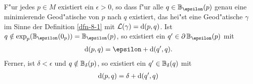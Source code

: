 \begin{Satz}\label{satz-8-7}
  F"ur jedes $p \in M$ existiert ein $\epsilon > 0$, so dass f"ur alle $q \in \B_{\epsilon}(p)$ genau eine minimierende Geod"atische von $p$ nach $q$ existiert, das hei"st eine Geod"atische $\gamma$ im Sinne der Definition \ref{dfn-8-1} mit $\mathcal L(\gamma) = \mathrm{d}(p,q)$.
  Ist $q \notin \exp_p(\B_{\epsilon}(0_p)) = \B_{\epsilon}(p)$, so existiert ein $q' \in \partial \B_{\epsilon}(p)$ mit
  \begin{align*}
    \dop(p,q) = \epsilon + \dop(q',q).
  \end{align*}
  Ferner, ist $\delta < \epsilon$ und $q \notin \operatorname{\mathbb{B}}_\delta(p)$, so existiert ein $q' \in \operatorname{\mathbb{B}}_\delta(q)$ mit
  \begin{align*}
    \mathrm{d}(p,q) = \delta + \mathrm{d}(q',q)
  \end{align*}
  \begin{center}\end{center}
\end{Satz}

